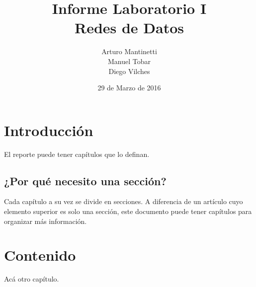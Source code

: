 \documentclass[spanish]{udpreport}
\title{Informe Laboratorio I \\ Redes de Datos}
\author{Arturo Mantinetti \\ Manuel Tobar \\ Diego Vilches}
\date{29 de Marzo de 2016}
\begin{document}
\maketitle

\tableofcontents

\chapter{Introducción}

El reporte puede tener capítulos que lo definan.

\section{¿Por qué necesito una sección?}

Cada capítulo a su vez se divide en secciones. A diferencia de un artículo cuyo elemento superior es solo una sección, este documento puede tener capítulos para organizar más información.

\chapter{Contenido}

Acá otro capítulo.

\listoffigures
\end{document}
